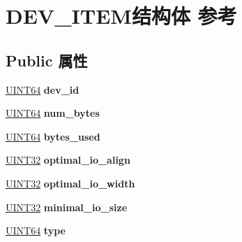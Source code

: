 \hypertarget{struct_d_e_v___i_t_e_m}{}\section{D\+E\+V\+\_\+\+I\+T\+E\+M结构体 参考}
\label{struct_d_e_v___i_t_e_m}
\subsection*{Public 属性}
\begin{DoxyCompactItemize}
\item 
\mbox{\label{struct_d_e_v___i_t_e_m_a0bc72f8e093c79b80b4b488e7b557986}} 
\hyperlink{_processor_bind_8h_a57be03562867144161c1bfee95ca8f7c}{U\+I\+N\+T64} {\bfseries dev\+\_\+id}
\item 
\mbox{\label{struct_d_e_v___i_t_e_m_aada67b31a09807c1255258d2ae4b07c4}} 
\hyperlink{_processor_bind_8h_a57be03562867144161c1bfee95ca8f7c}{U\+I\+N\+T64} {\bfseries num\+\_\+bytes}
\item 
\mbox{\label{struct_d_e_v___i_t_e_m_a5efef224eadc410033fff93010ee5833}} 
\hyperlink{_processor_bind_8h_a57be03562867144161c1bfee95ca8f7c}{U\+I\+N\+T64} {\bfseries bytes\+\_\+used}
\item 
\mbox{\label{struct_d_e_v___i_t_e_m_a3e0e44af374c7981ca97faba9ecf41a1}} 
\hyperlink{_processor_bind_8h_ae1e6edbbc26d6fbc71a90190d0266018}{U\+I\+N\+T32} {\bfseries optimal\+\_\+io\+\_\+align}
\item 
\mbox{\label{struct_d_e_v___i_t_e_m_aeaea94062c0a7bff6c51bab7c6762101}} 
\hyperlink{_processor_bind_8h_ae1e6edbbc26d6fbc71a90190d0266018}{U\+I\+N\+T32} {\bfseries optimal\+\_\+io\+\_\+width}
\item 
\mbox{\label{struct_d_e_v___i_t_e_m_a4b6c083ef6d163bfb16b5aa4b68fffec}} 
\hyperlink{_processor_bind_8h_ae1e6edbbc26d6fbc71a90190d0266018}{U\+I\+N\+T32} {\bfseries minimal\+\_\+io\+\_\+size}
\item 
\mbox{\label{struct_d_e_v___i_t_e_m_a311f8951dda25091be3d89a09b5b9871}} 
\hyperlink{_processor_bind_8h_a57be03562867144161c1bfee95ca8f7c}{U\+I\+N\+T64} {\bfseries type}

\end{DoxyCompactItemize}

